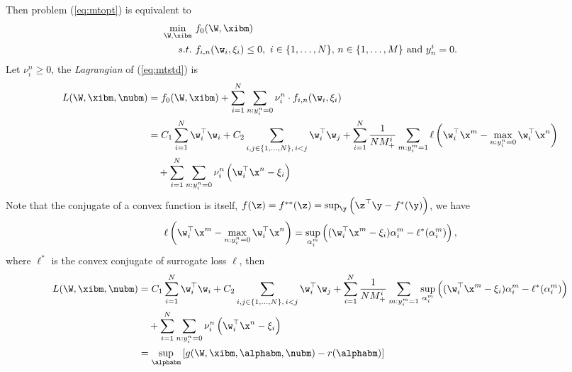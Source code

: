 Then problem (\ref{eq:mtopt}) is equivalent to 
\begin{equation}
\label{eq:mtstd}
\begin{aligned}
\min_{\W, \xibm} \ & f_0(\W, \xibm) \\
s.t. \ & f_{i,n}(\w_i, \xi_i) \le 0, \ i \in \{1,\dots,N\}, \, n \in \{1,\dots,M\} \ \mathrm{and} \ y_n^i = 0.
\end{aligned}
\end{equation}
Let $\nu_i^n \ge 0$, the \emph{Lagrangian} of (\ref{eq:mtstd}) is
\begin{equation*}
\begin{aligned}
L(\W, \xibm, \nubm) 
&= f_0(\W, \xibm) + \sum_{i=1}^{N} \sum_{n: y_i^n = 0} \nu_i^n \cdot f_{i,n}(\w_i, \xi_i) \\
&= C_1 \sum_{i=1}^{N} \w_i^\top \w_i + C_2 \sum_{i, j \in \{1,\dots,N\}, \, i < j} \w_i^\top \w_j
   + \sum_{i = 1}^{N} \frac{1}{N M_+^i} \sum_{m: y_i^m = 1} \ell \left( \w_i^\top \x^m - \max_{n: y_i^n = 0} \w_i^\top \x^n \right) \\
& \quad  + \sum_{i=1}^{N} \sum_{n: y_i^n = 0} \nu_i^n \left( \w_i^\top \x^n - \xi_i \right) \\
\end{aligned}
\end{equation*}
Note that the conjugate of a convex function is itself, \ie $f(\z) = f^{**}(\z) = \sup_\y \left( \z^\top \y - f^*(\y) \right)$, we have
\begin{equation*}
\begin{aligned}
\ell \left( \w_i^\top \x^m - \max_{n: y_i^n = 0} \w_i^\top \x^n \right) 
= \sup_{\alpha_i^m} \left( (\w_i^\top \x^m - \xi_i) \alpha_i^m - \ell^*(\alpha_i^m) \right),
\end{aligned}
\end{equation*}
where $\ell^*$ is the convex conjugate of surrogate loss $\ell$, then
\begin{equation*}
\begin{aligned}
L(\W, \xibm, \nubm) 
&= C_1 \sum_{i=1}^{N} \w_i^\top \w_i + C_2 \sum_{i, j \in \{1,\dots,N\}, \, i < j} \w_i^\top \w_j
   + \sum_{i = 1}^{N} \frac{1}{N M_+^i} \sum_{m: y_i^m = 1} 
     \sup_{\alpha_i^m} \left( (\w_i^\top \x^m - \xi_i) \alpha_i^m - \ell^*(\alpha_i^m) \right) \\
& \quad  + \sum_{i=1}^{N} \sum_{n: y_i^n = 0} \nu_i^n \left( \w_i^\top \x^n - \xi_i \right) \\
&= \sup_\alphabm \left[ g(\W, \xibm, \alphabm, \nubm) - r(\alphabm) \right]
\end{aligned}
\end{equation*}
